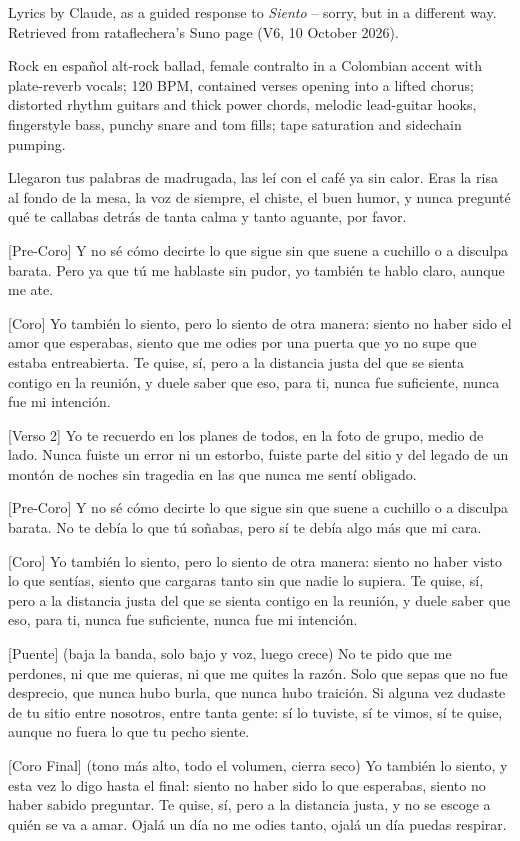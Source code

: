 \begin{notes}
Lyrics by Claude, as a guided response to \emph{Siento} -- sorry, but in a different way. Retrieved from rataflechera's Suno page (V6, 10 October 2026).
\end{notes}
\begin{style}
Rock en español alt-rock ballad, female contralto in a Colombian accent with plate-reverb vocals; 120 BPM, contained verses opening into a lifted chorus; distorted rhythm guitars and thick power chords, melodic lead-guitar hooks, fingerstyle bass, punchy snare and tom fills; tape saturation and sidechain pumping.
\end{style}
\begin{lyrics}
[Verso 1]
Llegaron tus palabras de madrugada,
las leí con el café ya sin calor.
Eras la risa al fondo de la mesa,
la voz de siempre, el chiste, el buen humor,
y nunca pregunté qué te callabas
detrás de tanta calma y tanto aguante, por favor.

[Pre-Coro]
Y no sé cómo decirte lo que sigue
sin que suene a cuchillo o a disculpa barata.
Pero ya que tú me hablaste sin pudor,
yo también te hablo claro, aunque me ate.

[Coro]
Yo también lo siento,
pero lo siento de otra manera:
siento no haber sido el amor que esperabas,
siento que me odies por una puerta
que yo no supe que estaba entreabierta.
Te quise, sí, pero a la distancia justa
del que se sienta contigo en la reunión,
y duele saber que eso, para ti,
nunca fue suficiente, nunca fue mi intención.

[Verso 2]
Yo te recuerdo en los planes de todos,
en la foto de grupo, medio de lado.
Nunca fuiste un error ni un estorbo,
fuiste parte del sitio y del legado
de un montón de noches sin tragedia
en las que nunca me sentí obligado.

[Pre-Coro]
Y no sé cómo decirte lo que sigue
sin que suene a cuchillo o a disculpa barata.
No te debía lo que tú soñabas,
pero sí te debía algo más que mi cara.

[Coro]
Yo también lo siento,
pero lo siento de otra manera:
siento no haber visto lo que sentías,
siento que cargaras tanto sin que nadie lo supiera.
Te quise, sí, pero a la distancia justa
del que se sienta contigo en la reunión,
y duele saber que eso, para ti,
nunca fue suficiente, nunca fue mi intención.

[Puente] (baja la banda, solo bajo y voz, luego crece)
No te pido que me perdones,
ni que me quieras, ni que me quites la razón.
Solo que sepas que no fue desprecio,
que nunca hubo burla, que nunca hubo traición.
Si alguna vez dudaste de tu sitio
entre nosotros, entre tanta gente:
sí lo tuviste, sí te vimos, sí te quise,
aunque no fuera lo que tu pecho siente.

[Coro Final] (tono más alto, todo el volumen, cierra seco)
Yo también lo siento,
y esta vez lo digo hasta el final:
siento no haber sido lo que esperabas,
siento no haber sabido preguntar.
Te quise, sí, pero a la distancia justa,
y no se escoge a quién se va a amar.
Ojalá un día no me odies tanto,
ojalá un día puedas respirar.
\end{lyrics}

